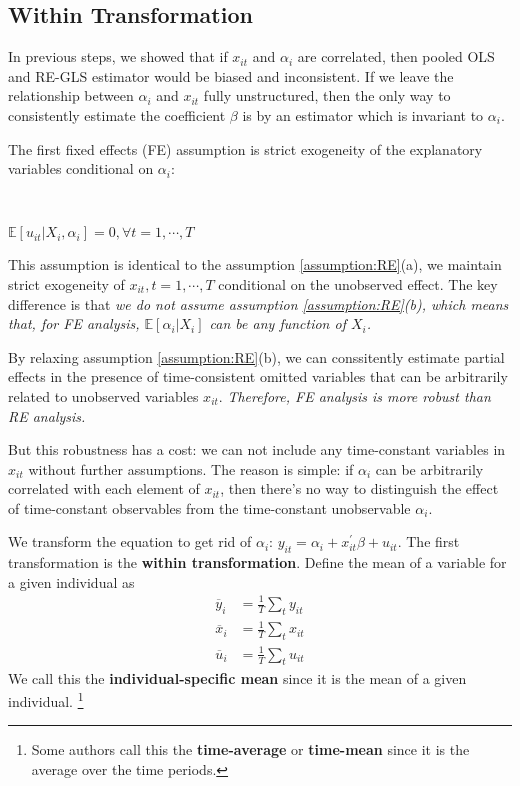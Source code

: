 \subsection{Within Transformation}

In previous steps, we showed that if $x_{it}$ and $\alpha_i$ are correlated, then pooled OLS and RE-GLS estimator would be biased and inconsistent.
If we leave the relationship between $\alpha_i$ and $x_{it}$ fully unstructured,
then the only way to consistently estimate the coefficient $\beta$ is by an estimator
which is invariant to $\alpha_i$.

The first fixed effects (FE) assumption is strict exogeneity of the explanatory variables conditional on $\alpha_i$:
\begin{assumption}\label{assumption:FE-strictexogeneity}
    \

    $\mathbb{E}[u_{it} | X_i, \alpha_i] = 0, \forall t=1,\cdots, T$
\end{assumption}
This assumption is identical to the assumption \ref{assumption:RE}(a), we maintain strict exogeneity of $x_{it}, t=1, \cdots, T$
conditional on the unobserved effect.
The key difference is that \emph{we do not assume assumption \ref{assumption:RE}(b), which means that,
for FE analysis, $\mathbb{E}[\alpha_i | X_i]$ can be any function of $X_i$.}

By relaxing assumption \ref{assumption:RE}(b), we can conssitently estimate partial effects in the presence of time-consistent omitted variables
that can be arbitrarily related to unobserved variables $x_{it}$.
\emph{Therefore, FE analysis is more robust than RE analysis.}

But this robustness has a cost: we can not include any time-constant variables in $x_{it}$ without further assumptions.
The reason is simple: if $\alpha_i$ can be arbitrarily correlated with each element of $x_{it}$, 
then there's no way to distinguish the effect of time-constant observables from the time-constant unobservable $\alpha_i$.

We transform the equation to get rid of $\alpha_i$: $y_{it} = \alpha_i + x_{it}^{\prime} \beta + u_{it}.$
The first transformation is the \textbf{within transformation}.
Deﬁne the mean of a variable for a given individual as
\begin{align*}
    \overline{y}_i &= \frac{1}{T} \sum_t y_{it} \\
    \overline{x}_i &= \frac{1}{T} \sum_t x_{it} \\
    \overline{u}_i &= \frac{1}{T} \sum_t u_{it}
\end{align*}
We call this the \textbf{individual-specific mean} since it is the mean of a given individual. \footnote{Some
authors call this the \textbf{time-average} or \textbf{time-mean} since it is the average over the time periods.}


